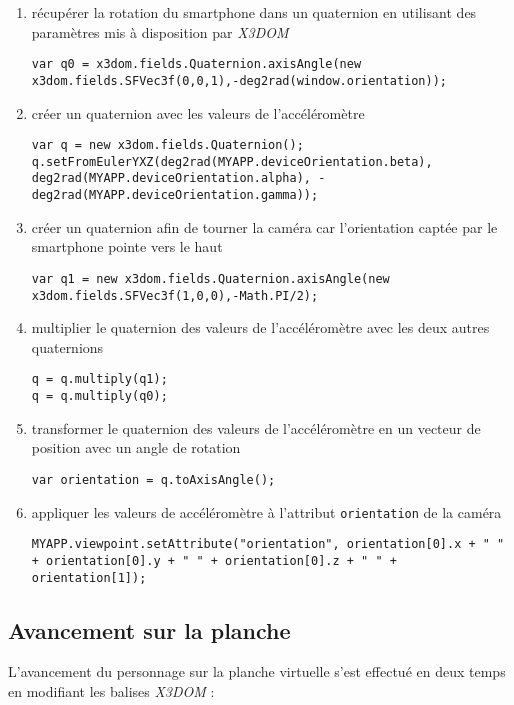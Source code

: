 \begin{enumerate}
\item récupérer la rotation du \textsf{smartphone} dans un quaternion en utilisant des paramètres mis à disposition par \textit{X3DOM}
\begin{lstlisting}
var q0 = x3dom.fields.Quaternion.axisAngle(new x3dom.fields.SFVec3f(0,0,1),-deg2rad(window.orientation));		       
\end{lstlisting}

\item créer un quaternion avec les valeurs de l'accéléromètre
\begin{lstlisting}
var q = new x3dom.fields.Quaternion();
q.setFromEulerYXZ(deg2rad(MYAPP.deviceOrientation.beta), deg2rad(MYAPP.deviceOrientation.alpha), -deg2rad(MYAPP.deviceOrientation.gamma));
\end{lstlisting}

\item créer un quaternion afin de tourner la caméra car l'orientation captée par le \textsf{smartphone} pointe vers le haut
\begin{lstlisting}
var q1 = new x3dom.fields.Quaternion.axisAngle(new x3dom.fields.SFVec3f(1,0,0),-Math.PI/2); 
\end{lstlisting}

\item multiplier le quaternion des valeurs de l'accéléromètre avec les deux autres quaternions
\begin{lstlisting}
q = q.multiply(q1);
q = q.multiply(q0);
\end{lstlisting}

\item transformer le quaternion des valeurs de l'accéléromètre en un vecteur de position avec un angle de rotation
\begin{lstlisting}
var orientation = q.toAxisAngle();
\end{lstlisting}

\item appliquer les valeurs de accéléromètre à l'attribut \texttt{orientation} de la caméra 
\begin{lstlisting}
MYAPP.viewpoint.setAttribute("orientation", orientation[0].x + " " + orientation[0].y + " " + orientation[0].z + " " + orientation[1]);
\end{lstlisting}
\end{enumerate}

\subsection*{Avancement sur la planche}  \label{avancement}
L'avancement du personnage sur la planche virtuelle s'est effectué en deux temps en modifiant les balises \textit{X3DOM} :\\


